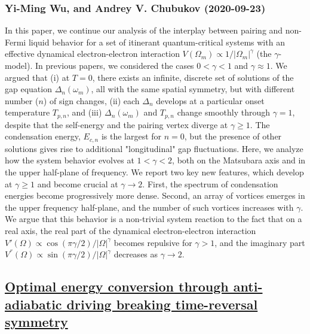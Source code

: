 {\subsubsection*{Yi-Ming Wu, and Andrey V. Chubukov (2020-09-23)}
In this paper, we continue our analysis of the interplay between pairing and
non-Fermi liquid behavior for a set of itinerant quantum-critical systems with
an effective dynamical electron-electron interaction $V(\Omega_m) \propto
1/|\Omega_m|^\gamma$ (the $\gamma$-model). In previous papers, we considered
the cases $0 < \gamma <1$ and $\gamma \approx 1$. We argued that (i) at $T=0$,
there exists an infinite, discrete set of solutions of the gap equation
$\Delta_n (\omega_m)$, all with the same spatial symmetry, but with different
number ($n$) of sign changes, (ii) each $\Delta_n$ develops at a particular
onset temperature $T_{p,n}$, and (iii) $\Delta_n (\omega_m)$ and $T_{p,n}$
change smoothly through $\gamma =1$, despite that the self-energy and the
pairing vertex diverge at $\gamma \geq 1$. The condensation energy, $E_{c,n}$
is the largest for $n=0$, but the presence of other solutions gives rise to
additional "longitudinal" gap fluctuations. Here, we analyze how the system
behavior evolves at $1<\gamma <2$, both on the Matsubara axis and in the upper
half-plane of frequency. We report two key new features, which develop at
$\gamma \geq 1$ and become crucial at $\gamma \to 2$. First, the spectrum of
condensation energies become progressively more dense. Second, an array of
vortices emerges in the upper frequency half-plane, and the number of such
vortices increases with $\gamma$. We argue that this behavior is a non-trivial
system reaction to the fact that on a real axis, the real part of the dynamical
electron-electron interaction $V' (\Omega) \propto \cos(\pi
\gamma/2)/|\Omega|^\gamma$ becomes repulsive for $\gamma >1$, and the imaginary
part $V^{''} (\Omega) \propto \sin(\pi \gamma/2)/|\Omega|^\gamma$ decreases as
$\gamma \to 2$.

\subsection*{\href{http://arxiv.org/abs/2009.10904v1}{Optimal energy conversion through anti-adiabatic driving breaking  time-reversal symmetry}}
}

